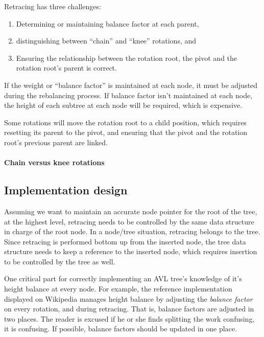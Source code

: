 Retracing has three challenges:

\begin{enumerate}
  \item Determining or maintaining balance factor at each parent,
  \item distinguishing between ``chain'' and ``knee'' rotations, and
  \item Ensuring the relationship between the rotation root, the pivot
    and the rotation root's parent is correct.
\end{enumerate}

If the weight or ``balance factor'' is maintained at each node, it must be
adjusted during the rebalancing process. If balance factor isn't maintained at
each node, the height of each subtree at each node will be required, which is
expensive.

Some rotations will move the rotation root to a child position, which
requires resetting its parent to the pivot, and ensuring that the
pivot and the rotation root's previous parent are linked.

\paragraph{Chain versus knee rotations}

\subsection{Implementation design}

Assuming we want to maintain an accurate node pointer for the root of the tree,
at the highest level, retracing needs to be controlled by the same data
structure in charge of the root node. In a node/tree situation, retracing
belongs to the tree. Since retracing is performed bottom up from the
inserted node, the tree data structure needs to keep a reference to
the inserted node, which requires insertion to be controlled by the
tree as well.

One critical part for correctly implementing an AVL tree's knowledge of
it's height balance at every node. For example, the reference implementation
displayed on Wikipedia manages height balance by adjusting the
\textit{balance factor} on every rotation, and during retracing. That is,
balance factors are adjusted in two places. The reader is excused if
he or she finds splitting the work confusing, it is confusing. If possible,
balance factors should be updated in one place.
